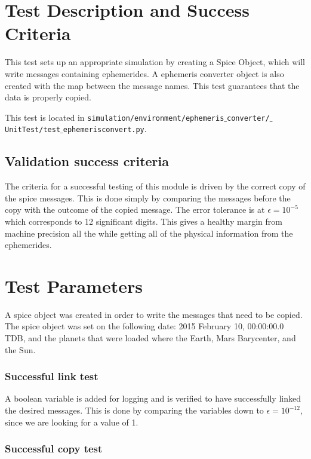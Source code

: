 \section{Test Description and Success Criteria}

This test sets up an appropriate simulation by creating a Spice Object, which will write messages containing ephemerides. A ephemeris converter object is also created with the map between the message names. This test guarantees that the data is properly copied.

This test is located in {\tt simulation/environment/ephemeris$\_$converter/$\_$UnitTest/test$\_$ephemerisconvert.py}. \par

\subsection{Validation success criteria }

The criteria for a successful testing of this module is driven by the correct copy of the spice messages. This is done simply by comparing the messages before the copy with the outcome of the copied message. The error tolerance is at $\epsilon =10^{-5}$ which corresponds to 12 significant digits. This gives a healthy margin from machine precision all the while getting all of the physical information from the ephemerides. 

\section{Test Parameters}

A spice object was created in order to write the messages that need to be copied.
The spice object was set on the following date: 2015 February 10, 00:00:00.0 TDB, and the planets that were loaded where the Earth, Mars Barycenter, and the Sun.

\subsubsection*{Successful link test}

A boolean variable is added for logging and is verified to have successfully linked the desired messages. This is done by comparing the variables down to $\epsilon =10^{-12}$, since we are looking for a value of 1.

\subsubsection*{Successful copy test}


